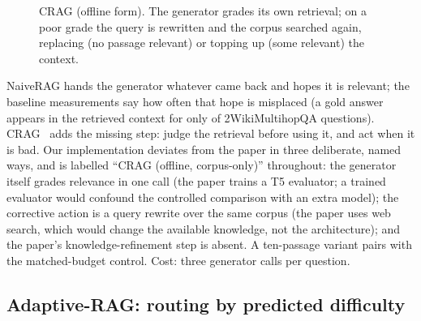 \begin{figure}[t]
\centering
{}
\caption{CRAG (offline form). The generator grades its own retrieval; on a
poor grade the query is rewritten and the corpus searched again, replacing
(no passage relevant) or topping up (some relevant) the context.}
\label{fig:arch-crag}
\end{figure}

NaiveRAG hands the generator whatever came back and hopes it is relevant;
the baseline measurements say how often that hope is misplaced (a gold
answer appears in the retrieved context for only
\NaiveRAGTwoWikiAnswerInContext{} of 2WikiMultihopQA questions).
CRAG~\citep{yan2024crag} adds the missing step: judge the retrieval before
using it, and act when it is bad. Our implementation deviates from the
paper in three deliberate, named ways, and is labelled ``CRAG (offline,
corpus-only)'' throughout: the generator itself grades relevance in one
call (the paper trains a T5 evaluator; a trained evaluator would confound
the controlled comparison with an extra model); the corrective action is a
query rewrite over the same corpus (the paper uses web search, which would
change the available knowledge, not the architecture); and the paper's
knowledge-refinement step is absent. A ten-passage variant pairs with the
matched-budget control. Cost: three generator calls per question.

\subsection{Adaptive-RAG: routing by predicted difficulty}
\label{sec:arch-adaptive}

